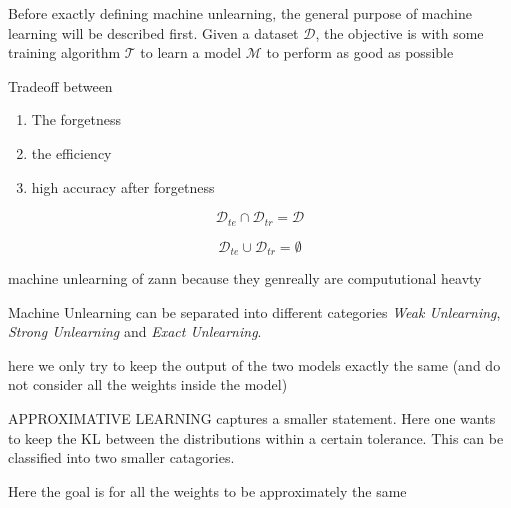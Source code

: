 


Before exactly defining machine unlearning, the general purpose of machine learning will be described first. Given a dataset $\mathcal{D}$, the objective is with some training algorithm $\mathcal{T}$ to learn a model $\mathcal{M}$ to perform as good as possible 



Tradeoff between
\begin{enumerate}
    \item The forgetness
    \item the efficiency
    \item high accuracy after forgetness
\end{enumerate}




















\[
    \mathcal{D}_{te} \cap \mathcal{D}_{tr} = \mathcal{D}
\]

\[
    \mathcal{D}_{te} \cup \mathcal{D}_{tr} = \emptyset
\]


machine unlearning of zann because they genreally are compututional heavty





Machine Unlearning can be separated into different categories \textit{Weak Unlearning}, \textit{Strong Unlearning} and \textit{Exact Unlearning}.


 

\begin{definition}
    here we only try to keep the output of the two models exactly the same (and do not consider all the weights inside the model)
\end{definition}

APPROXIMATIVE LEARNING captures a smaller statement. Here one wants to keep the KL between the distributions within a certain tolerance. This can be classified into two smaller catagories.

\begin{definition}
     Here the goal is for all the weights to be approximately the same
\end{definition}

